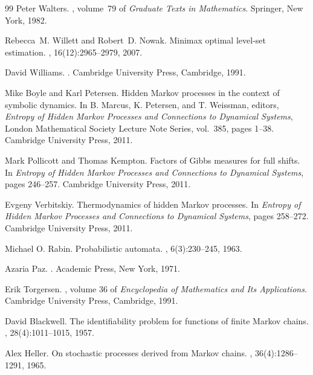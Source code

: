 \begin{thebibliography}{99}
Peter Walters.
, volume~79 of {\em Graduate
  Texts in Mathematics}.
\newblock Springer, New York, 1982.

Rebecca~M. Willett and Robert~D. Nowak.
\newblock Minimax optimal level-set estimation.
, 16(12):2965--2979,
  2007.

David Williams.
.
\newblock Cambridge University Press, Cambridge, 1991.

Mike Boyle and Karl Petersen.
\newblock Hidden Markov processes in the context of symbolic dynamics.
\newblock In B. Marcus, K. Petersen, and T. Weissman, editors, {\em Entropy of
  Hidden Markov Processes and Connections to Dynamical Systems}, London
  Mathematical Society Lecture Note Series, vol.~385, pages 1--38. Cambridge
  University Press, 2011.

Mark Pollicott and Thomas Kempton.
\newblock Factors of Gibbs measures for full shifts.
\newblock In {\em Entropy of Hidden Markov Processes and Connections to
  Dynamical Systems}, pages 246--257. Cambridge University Press, 2011.

Evgeny Verbitskiy.
\newblock Thermodynamics of hidden Markov processes.
\newblock In {\em Entropy of Hidden Markov Processes and Connections to
  Dynamical Systems}, pages 258--272. Cambridge University Press, 2011.

Michael O. Rabin.
\newblock Probabilistic automata.
, 6(3):230--245, 1963.

Azaria Paz.
.
\newblock Academic Press, New York, 1971.

Erik Torgersen.
, volume 36 of {\em
  Encyclopedia of Mathematics and Its Applications}.
\newblock Cambridge University Press, Cambridge, 1991.

David Blackwell.
\newblock The identifiability problem for functions of finite {M}arkov chains.
, 28(4):1011--1015, 1957.

Alex Heller.
\newblock On stochastic processes derived from {M}arkov chains.
, 36(4):1286--1291, 1965.


\end{thebibliography}
